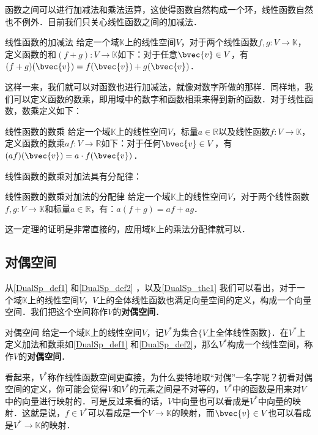 函数之间可以进行加减法和乘法运算，这使得函数自然构成一个环，线性函数自然也不例外．目前我们只关心线性函数之间的加减法．

\begin{definition}{线性函数的加减法}\label{DualSp_def1}
给定一个域$\mathbb{K}$上的线性空间$V$，对于两个线性函数$f, g: V\rightarrow\mathbb{K}$，定义函数的和$(f+g):V\rightarrow\mathbb{K}$如下：对于任意$\bvec{v}\in V$，有$(f+g)(\bvec{v})=f(\bvec{v})+g(\bvec{v})$．
\end{definition}

这样一来，我们就可以对函数也进行加减法，就像对数字所做的那样．同样地，我们可以定义函数的数乘，即用域中的数字和函数相乘来得到新的函数．对于线性函数，数乘定义如下：

\begin{definition}{线性函数的数乘}\label{DualSp_def2}
给定一个域$\mathbb{K}$上的线性空间$V$，标量$a\in\mathbb{R}$以及线性函数$f: V\rightarrow\mathbb{K}$，定义函数的数乘$af:V\rightarrow\mathbb{R}$如下：对于任何$\bvec{v}\in V$，有$(af)(\bvec{v})=a\cdot f(\bvec{v})$．
\end{definition}

线性函数的数乘对加法具有分配律：

\begin{theorem}{线性函数的数乘对加法的分配律}\label{DualSp_the1}
给定一个域$\mathbb{K}$上的线性空间$V$，对于两个线性函数$f, g: V\rightarrow\mathbb{K}$和标量$a\in\mathbb{R}$，有：$a(f+g)=af+ag$．
\end{theorem}

这一定理的证明是非常直接的，应用域$\mathbb{K}$上的乘法分配律就可以．

\subsection{对偶空间}

从\autoref{DualSp_def1} 和\autoref{DualSp_def2} ，以及\autoref{DualSp_the1} 我们可以看出，对于一个域$\mathbb{K}$上的线性空间$V$，$V$上的全体线性函数也满足向量空间的定义，构成一个向量空间．我们把这个空间称作$V$的\textbf{对偶空间}．

\begin{definition}{对偶空间}
给定一个域$\mathbb{K}$上的线性空间$V$，记$V^*$为集合$\{V\text{上全体线性函数}\}$．在$V^*$上定义加法和数乘如\autoref{DualSp_def1} 和\autoref{DualSp_def2}，那么$V^*$构成一个线性空间，称作$V$的\textbf{对偶空间}．
\end{definition}

看起来，$V^*$称作线性函数空间更直接，为什么要特地取“对偶”一名字呢？初看对偶空间的定义，你可能会觉得$V$和$V^*$的元素之间是不对等的，$V^*$中的函数是用来对$V$中的向量进行映射的．可是反过来看的话，$V$中向量也可以看成是$V^*$中向量的映射．这就是说，$f\in V^*$可以看成是一个$V\rightarrow\mathbb{K}$的映射，而$\bvec{v}\in V$也可以看成是$V^*\rightarrow\mathbb{K}$的映射．

